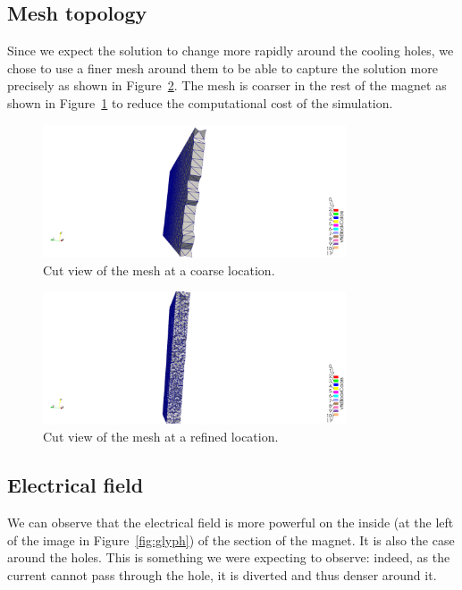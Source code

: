 \documentclass[12pt]{article}
\begin{document}
\subsection{Mesh topology}
Since we expect the solution to change more rapidly around the cooling holes,
we chose to use a finer mesh around them to be able to capture the solution more
precisely as shown in Figure~\ref{fig:mesh_fine}. The mesh is coarser in the
rest of the magnet as shown in Figure~\ref{fig:mesh_coarse} to reduce the computational
cost of the simulation.

\begin{figure}[H]
  \centering
  \includegraphics[width=0.8\textwidth]{images/grossier2.png}
  \caption{Cut view of the mesh at a coarse location.}
  \label{fig:mesh_coarse}
\end{figure}

\begin{figure}[H]
  \centering
  \includegraphics[width=0.8\textwidth]{images/raffiner2.png}
  \caption{Cut view of the mesh at a refined location.}
  \label{fig:mesh_fine}
\end{figure}

\subsection{Electrical field}
We can observe that the electrical field is more powerful on the inside (at the
left of the image in Figure~\ref{fig:glyph}) of the section of the magnet.
It is also the case around the holes. This is something we were expecting to
observe: indeed, as the current cannot pass through the hole, it is diverted and
thus denser around it.
\end{document}
